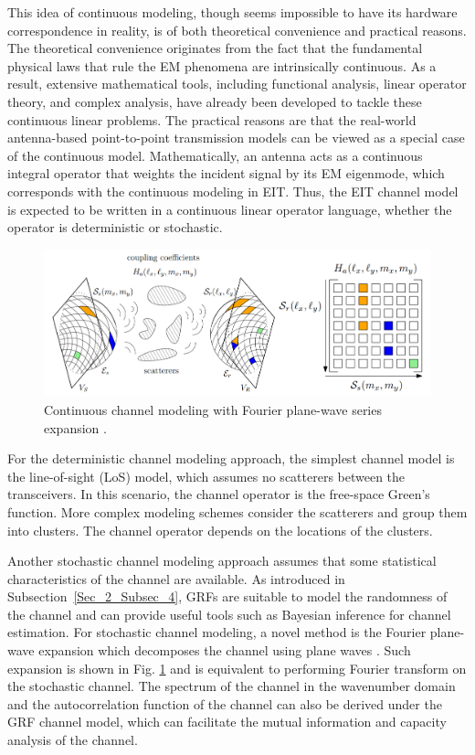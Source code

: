 \documentclass[journal,twocolumn]{IEEEtran}
\begin{document}
This idea of continuous modeling, though seems impossible to have its hardware correspondence in reality, is of both theoretical convenience and practical reasons. 
The theoretical convenience originates from the fact that the fundamental physical laws that rule the EM phenomena are intrinsically continuous. 
As a result, extensive mathematical tools, including functional analysis, linear operator theory, and complex analysis, have already been developed to tackle these continuous linear problems. 
The practical reasons are that the real-world antenna-based point-to-point transmission models can be viewed as a special case of the continuous model. 
Mathematically, an antenna acts as a continuous integral operator that weights the incident signal by its EM eigenmode, which corresponds with the continuous modeling in EIT. 
Thus, the EIT channel model is expected to be written in a continuous linear operator language, whether the operator is deterministic or stochastic.
\begin{figure}
	\centering 
	\includegraphics[width=\linewidth]{figures/random_channel.png} 
	\caption{Continuous channel modeling with Fourier plane-wave series expansion \cite{marzetta2022fourier}.} 
	\label{fig:marzetta}
\end{figure}

For the deterministic channel modeling approach, the simplest channel model is the line-of-sight (LoS) model, which assumes no scatterers between the transceivers. In this scenario, the channel operator is the free-space Green's function. More complex modeling schemes consider the scatterers and group them into clusters. The channel operator depends on the locations of the clusters.

Another stochastic channel modeling approach assumes that some statistical characteristics of the channel are available. As introduced in Subsection~\ref{Sec_2_Subsec_4}, GRFs are suitable to model the randomness of the channel and can provide useful tools such as Bayesian inference for channel estimation. For  stochastic channel modeling, a novel method is the Fourier plane-wave expansion which decomposes the channel using plane waves \cite{marzetta2022fourier}. Such expansion is shown in Fig. \ref{fig:marzetta} and is equivalent to performing Fourier transform on the stochastic channel. The spectrum of the channel in the wavenumber domain and the autocorrelation function of the channel can also be derived under the GRF channel model, which can facilitate the mutual information and capacity analysis of the channel.
\end{document}
